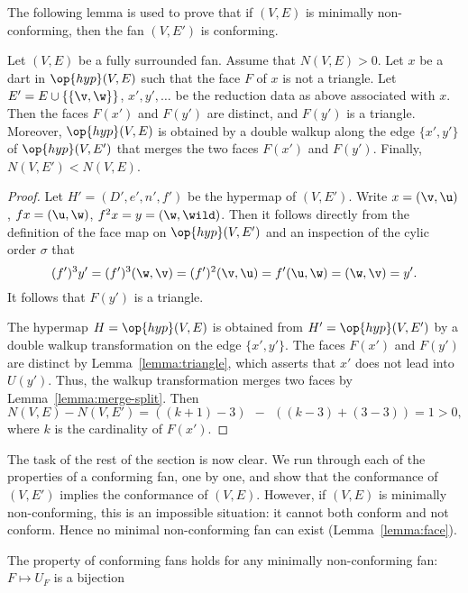 The following lemma is used to prove that if $(V,E)$ is minimally non-conforming,
then the fan $(V,E')$ is conforming.

\begin{lemma}[]\label{lemma:lessN}
  Let $(V,E)$ be a fully surrounded fan.  Assume that $N(V,E)>0$.  Let
  $x$ be a dart in $\op{hyp}(V,E)$ such that the face $F$ of $x$ is
  not a triangle.  Let $E'=E\cup \{\{\v,\w\}\}$, $x',y',\ldots$ be the reduction data
  as above associated with $x$.  Then the faces $F(x')$ and $F(y')$ are distinct, and
  $F(y')$ is a
  triangle. Moreover, $\op{hyp}(V,E)$ is obtained by a double walkup along the
  edge $\{x',y'\}$ of $\op{hyp}(V,E')$ that merges the two faces $F(x')$ and $F(y')$.
  Finally, $N(V,E')<N(V,E)$.
\end{lemma}


\begin{proof} Let $H'=(D',e',n',f')$ be the hypermap of $(V,E')$.
Write $x = (\v,\u)$, $f x = (\u,\w)$, $f^2 x = y = (\w,\wild )$.
Then it follows directly from the definition of the face map on $\op{hyp}(V,E')$
and an inspection of the cylic order $\sigma$ that
\begin{displaymath}
(f')^3 y' = (f')^3 (\w,\v) = (f')^2(\v,\u) = f' (\u,\w) = (\w,\v) = y'.
\end{displaymath}
It follows that $F(y')$ is a triangle.

The hypermap $H=\op{hyp}(V,E)$ is obtained from $H'=\op{hyp}(V,E')$ by
a double walkup transformation on the edge $\{x',y'\}$.  The faces
$F(x')$ and $F(y')$ are distinct by Lemma~\ref{lemma:triangle}, which
asserts that $x'$ does not lead into $U(y')$.  Thus, the walkup
transformation merges two faces by Lemma~\ref{lemma:merge-split}.
Then
\begin{displaymath}N(V,E) - N(V,E') = ((k+1)-3) ~~-~~ ((k-3) +
(3-3)) = 1 >0,\end{displaymath} where $k$ is the cardinality of
$F(x')$.
\end{proof}

The task of the rest of the section is now clear.  We run through each
of the properties of a conforming fan, one by one, and show that the
conformance of $(V,E')$ implies the conformance of $(V,E)$.  However,
if $(V,E)$ is minimally non-conforming, this is an impossible
situation: it cannot both conform and not conform.  Hence no minimal
non-conforming fan can exist (Lemma~\ref{lemma:face}).

\begin{lemma}[bijection]
The property  of conforming fans holds for any
minimally non-conforming fan: $F\mapsto U_F$ is a bijection
\end{lemma}

